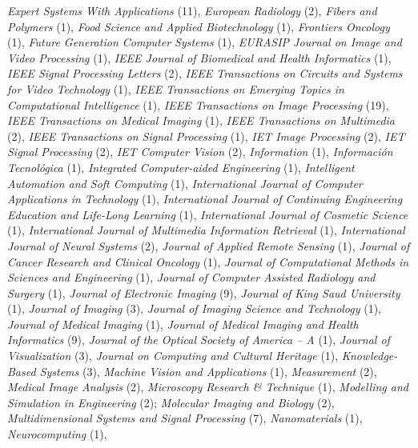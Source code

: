 \documentclass[11pt]{article}
\begin{document}
\begin{itemize}
    \emph{Expert Systems With Applications} (11),
    \emph{European Radiology} (2),
    \emph{Fibers and Polymers} (1),
    \emph{Food Science and Applied Biotechnology} (1),
    \emph{Frontiers Oncology} (1),
    \emph{Future Generation Computer Systems} (1),
    \emph{EURASIP Journal on Image and Video Processing} (1),
    \emph{IEEE Journal of Biomedical and Health Informatics} (1),
    \emph{IEEE Signal Processing Letters} (2),
    \emph{IEEE Transactions on Circuits and Systems for Video Technology} (1),
    \emph{IEEE Transactions on Emerging Topics in Computational Intelligence} (1),
    \emph{IEEE Transactions on Image Processing} (19),
    \emph{IEEE Transactions on Medical Imaging} (1),
    \emph{IEEE Transactions on Multimedia} (2),
    \emph{IEEE Transactions on Signal Processing} (1),
    \emph{IET Image Processing} (2),
    \emph{IET Signal Processing} (2),
    \emph{IET Computer Vision} (2),
    \emph{Information} (1),
    \emph{Información Tecnológica} (1),
    \emph{Integrated Computer-aided Engineering} (1),
    \emph{Intelligent Automation and Soft Computing} (1),
    \emph{International Journal of Computer Applications in Technology} (1),
    \emph{International  Journal  of Continuing  Engineering  Education and  Life-Long Learning} (1),
    \emph{International Journal of Cosmetic Science} (1),
    \emph{International Journal of Multimedia Information Retrieval} (1),
    \emph{International Journal of Neural Systems} (2),
    \emph{Journal of Applied Remote Sensing} (1),
    \emph{Journal of Cancer Research and Clinical Oncology} (1),
    \emph{Journal of Computational Methods in Sciences and Engineering} (1),
		\emph{Journal of Computer Assisted Radiology and Surgery} (1),
    \emph{Journal of Electronic Imaging} (9),
		\emph{Journal of King Saud University} (1),
    \emph{Journal of Imaging} (3),
    \emph{Journal of Imaging Science and Technology} (1),
    \emph{Journal of Medical Imaging} (1),
    \emph{Journal of Medical Imaging and Health Informatics} (9),
    \emph{Journal of the Optical Society of America -- A} (1),
    \emph{Journal of Visualization} (3),
    \emph{Journal on Computing and Cultural Heritage} (1),
    \emph{Knowledge-Based Systems} (3),
    \emph{Machine Vision and Applications} (1),
    \emph{Measurement} (2),
		\emph{Medical Image Analysis} (2),
    \emph{Microscopy Research \& Technique} (1),
		\emph{Modelling and Simulation in Engineering} (2);
    \emph{Molecular Imaging and Biology} (2),
    \emph{Multidimensional Systems and Signal Processing} (7),
    \emph{Nanomaterials} (1),
    \emph{Neurocomputing} (1),

\end{itemize}
\end{document}
